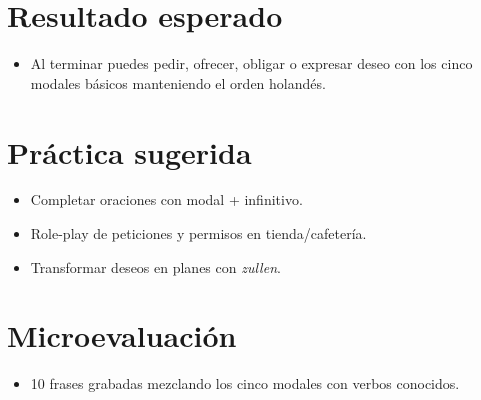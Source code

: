 \section{Resultado esperado}
\begin{itemize}[leftmargin=*]
	\item Al terminar puedes pedir, ofrecer, obligar o expresar deseo con los cinco modales básicos manteniendo el orden holandés.
\end{itemize}

\section{Práctica sugerida}
\begin{itemize}[leftmargin=*]
	\item Completar oraciones con modal + infinitivo.
	\item Role-play de peticiones y permisos en tienda/cafetería.
	\item Transformar deseos en planes con \textit{zullen}.
\end{itemize}

\section{Microevaluación}
\begin{itemize}[leftmargin=*]
	\item 10 frases grabadas mezclando los cinco modales con verbos conocidos.
\end{itemize}
